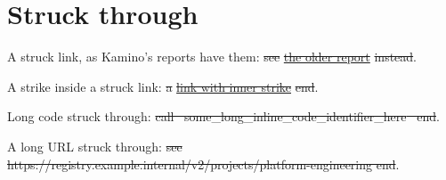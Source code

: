 \documentclass[
]{article}
\author{}
\date{}
\renewcommand{\texttt}[1]{%
  \colorbox{termbg}{{\ttfamily\relsize{-1}\color{termfg}#1}}%
}
\begin{document}
\section{Struck through}\label{struck-through}

A struck link, as Kamino's reports have them: \st{see
}\href{titled.md}{\st{the older report}}\st{ instead}.

A strike inside a struck link: \st{a }\href{titled.md}{\st{link with
inner strike}}\st{ end}.

Long code struck through: \st{call
\mbox{\texttt{some\_long\_inline\_code\_identifier\_here}} end}.

A long URL struck through: \st{see
https://registry.example.internal/v2/projects/platform-engineering end}.
\end{document}
